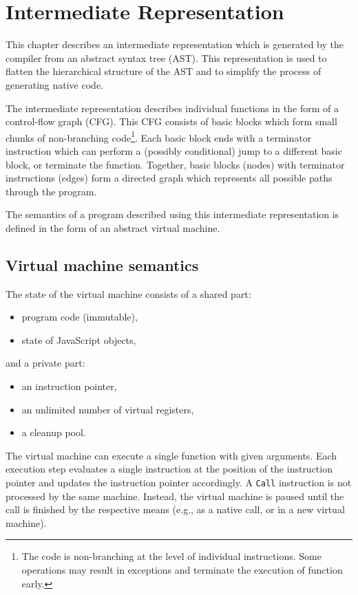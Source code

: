 \chapter{Intermediate Representation}\label{ir}

This chapter describes an intermediate representation which is generated by the compiler from an abstract syntax tree (AST). This representation is used to flatten the hierarchical structure of the AST and to simplify the process of generating native code.

The intermediate representation describes individual functions in the form of a control-flow graph (CFG). This CFG consists of basic blocks which form small chunks of non-branching code\footnote{The code is non-branching at the level of individual instructions. Some operations may result in exceptions and terminate the execution of function early.}. Each basic block ends with a terminator instruction which can perform a (possibly conditional) jump to a different basic block, or terminate the function. Together, basic blocks (nodes) with terminator instructions (edges) form a directed graph which represents all possible paths through the program.

The semantics of a program described using this intermediate representation is defined in the form of an abstract virtual machine.


\section{Virtual machine semantics}\label{ir:vm}

The state of the virtual machine consists of a shared part:
\begin{itemize}
    \item program code (immutable),
    \item state of JavaScript objects,
\end{itemize}

\noindent
and a private part:
\begin{itemize}
    \item an instruction pointer,
    \item an unlimited number of virtual registers,
    \item a cleanup pool.
\end{itemize}

The virtual machine can execute a single function with given arguments. Each execution step evaluates a single instruction at the position of the instruction pointer and updates the instruction pointer accordingly. A \texttt{Call} instruction is not processed by the same machine. Instead, the virtual machine is paused until the call is finished by the respective means (e.g., as a native call, or in a new virtual machine).


